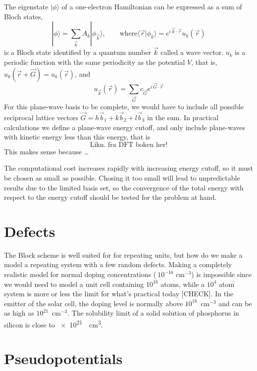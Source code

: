 \documentclass[11pt,bibliography=totoc,index=totoc]{scrbook}   %
\begin{document}
The eigenstate $|\phi\rangle$ of a one-electron Hamiltonian can be expressed 
as a sum of Bloch states,
\begin{equation}
  |\phi\rangle = \sum_{\vec{k}} A_k |\phi_{\vec{k}}\rangle,\qquad \text{where} 
  \langle\vec{r}|\phi_k\rangle = e^{i\,\vec{k}\cdot\vec{r}} u_k(\vec{r})
\end{equation}
is a Bloch state identified by a quantum number $\vec{k}$ called a wave vector.
$u_k$ is a periodic function with the same periodicity as
the potential $V$, that is, $u_k(\vec{r}+\vec{G}) = u_k(\vec{r})$, and
\begin{equation}
  u_{\vec{k}}(\vec{r}) = \sum_{\vec{G}} c_{\vec{G}} e^{i\,\vec{G}\cdot\vec{r}}
\end{equation}
For this plane-wave basis to be complete, we would have to include all possible
reciprocal lattice vectors $\vec{G} = h\vec{b}_1 + k\vec{b}_2 + l\vec{b}_3$ in
the sum. In practical calculations we define a plane-wave energy cutoff, and
only include plane-waves with kinetic energy less than this energy, that is
\begin{equation}
  \text{Likn. fra DFT boken her!}
\end{equation}
This makes sense because \ldots

The computational cost increases rapidly with increasing energy cutoff, so it
must be chosen as small as possible. Chosing it too small will lead to
unpredictable results due to the limited basis set, so the convergence of the 
total energy with respect to the energy cutoff should be tested for the 
problem at hand.

\section{Defects}

The Block scheme is well suited for for repeating units, but how do we make a
model a repeating system with a few random defects.
Making a completely realistic model for normal doping 
concentrations ($~10^{-16}$ cm$^{-3}$) is impossible since we would need to 
model a unit cell containing $10^{16}$ atoms, while a $10^4$ atom system is more or
less the limit for what's practical today [CHECK]. In the emitter of the
solar cell, the doping level is normally above $10^{18}$~cm$^{-3}$ and can be
as high as $10^{21}$~cm$^{-3}$. The solubility limit of a solid solution of
phosphorus in silicon is close to \SI{e21}{\per\centi\metre\cubed}\cite{Ghandhi:1994}.

\section{Pseudopotentials}
\end{document}
